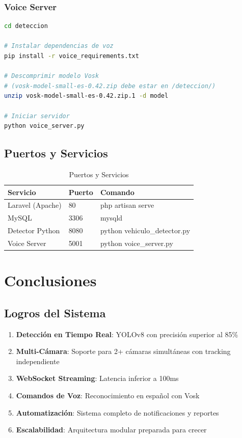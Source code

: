 \documentclass[12pt,a4paper]{article}
\begin{document}
\subsubsection{Voice Server}

\begin{lstlisting}[caption={Instalación Voice Server}, language=bash]
cd deteccion

# Instalar dependencias de voz
pip install -r voice_requirements.txt

# Descomprimir modelo Vosk
# (vosk-model-small-es-0.42.zip debe estar en /deteccion/)
unzip vosk-model-small-es-0.42.zip.1 -d model

# Iniciar servidor
python voice_server.py
\end{lstlisting}

\subsection{Puertos y Servicios}

\begin{table}[H]
\centering
\begin{tabular}{|l|l|l|}
\hline
\textbf{Servicio} & \textbf{Puerto} & \textbf{Comando} \\
\hline
Laravel (Apache) & 80 & php artisan serve \\
MySQL & 3306 & mysqld \\
Detector Python & 8080 & python vehiculo\_detector.py \\
Voice Server & 5001 & python voice\_server.py \\
\hline
\end{tabular}
\caption{Puertos y Servicios}
\end{table}

\newpage

\section{Conclusiones}

\subsection{Logros del Sistema}

\begin{enumerate}
    \item \textbf{Detección en Tiempo Real}: YOLOv8 con precisión superior al 85\%
    \item \textbf{Multi-Cámara}: Soporte para 2+ cámaras simultáneas con tracking independiente
    \item \textbf{WebSocket Streaming}: Latencia inferior a 100ms
    \item \textbf{Comandos de Voz}: Reconocimiento en español con Vosk
    \item \textbf{Automatización}: Sistema completo de notificaciones y reportes
    \item \textbf{Escalabilidad}: Arquitectura modular preparada para crecer
\end{enumerate}
\end{document}

